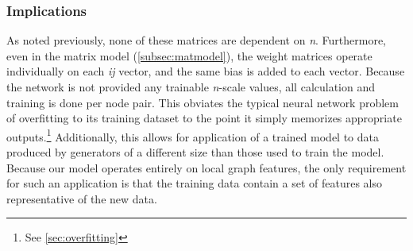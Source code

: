 \subsubsection{Implications}
As noted previously, none of these matrices are dependent on \textit{n}.  
Furthermore, even in the matrix model (\ref{subsec:matmodel}), the weight 
matrices operate individually on each \textit{ij} vector, and the same bias is 
added to each vector.  Because the network is not provided any trainable 
\textit{n}-scale values, all calculation and training is done per node pair.  
This obviates the typical neural network problem of overfitting to its training 
dataset to the point it simply memorizes appropriate outputs.\footnote{See 
\ref{sec:overfitting}} Additionally, this allows for application of a trained 
model to data produced by generators of a different size than those used to 
train the model. Because our model operates entirely on local graph features, 
the only requirement for such an application is that the training data contain a 
set of features also representative of the new data.
